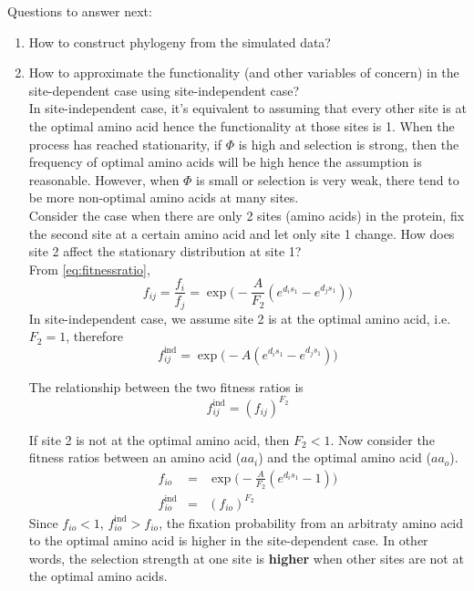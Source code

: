 \documentclass[13pt]{article}
\begin{document}
Questions to answer next:
\begin{enumerate}
\item How to construct phylogeny from the simulated data?\\

\item How to approximate the functionality (and other variables of concern) in the site-dependent case using site-independent case?\\

In site-independent case, it's equivalent to assuming that every other site is at the optimal amino acid hence the functionality at those sites is 1. When the process has reached stationarity, if $\Phi$ is high and selection is strong, then the frequency of optimal amino acids will be high hence the assumption is reasonable. However, when $\Phi$ is small or selection is very weak, there tend to be more non-optimal amino acids at many sites.\\

Consider the case when there are only 2 sites (amino acids) in the protein, fix the second site at a certain amino acid and let only site 1 change. How does site 2 affect the stationary distribution at site 1?\\

From \eqref{eq:fitnessratio},
\begin{equation}
f_{ij} = \frac{f_i}{f_j} = \exp\Big(-\frac{A}{F_2}(e^{d_is_1} - e^{d_js_1})\Big)
\label{eq:fitratioindep}
\end{equation}
In site-independent case, we assume site 2 is at the optimal amino acid, i.e. $F_2 = 1$, therefore
\begin{equation}
f_{ij}^{\text{ind}} = \exp\Big(-A(e^{d_is_1} - e^{d_js_1})\Big)
\end{equation}

The relationship between the two fitness ratios is
\begin{equation}
f_{ij}^{\text{ind}} = (f_{ij})^{F_2}
\end{equation}

If site 2 is not at the optimal amino acid, then $F_2 < 1$. Now consider the fitness ratios between an amino acid ($aa_i$) and the optimal amino acid ($aa_o$).\\
\begin{eqnarray}
f_{io} & = & \exp\Big(-\frac{A}{F_2}(e^{d_is_1} - 1)\Big)\\
f_{io}^{\text{ind}} & = & (f_{io})^{F_2}
\end{eqnarray}
Since $f_{io} < 1$, $f_{io}^{\text{ind}} > f_{io}$, the fixation probability from an arbitraty amino acid to the optimal amino acid is higher in the site-dependent case. In other words, the selection strength at one site is {\bf higher} when other sites are not at the optimal amino acids.\\


\end{enumerate}
\end{document}
